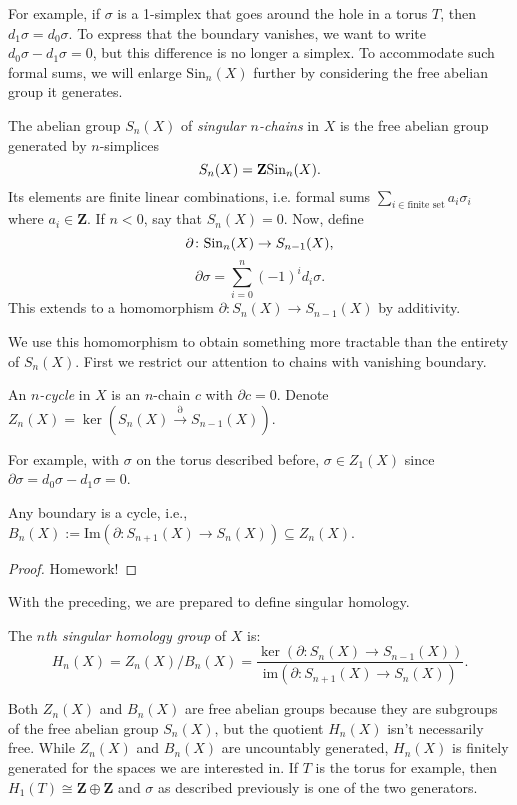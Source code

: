 For example, if $\sigma$ is a 1-simplex that goes around the hole in a torus $T$, then $d_1\sigma = d_0\sigma$. To express that the boundary vanishes, we want to write $d_0\sigma - d_1\sigma=0$, but this difference is no longer a simplex. To accommodate such formal sums, we will enlarge $\mathrm{Sin}_n(X)$ further by considering the free abelian group it generates.
\begin{definition}
The abelian group $S_n(X)$ of \emph{singular $n$-chains} in $X$ is the free abelian group generated by $n$-simplices
$$S_n(X) = \mathbf{Z}\mathrm{Sin}_n(X).$$
    Its elements are finite linear combinations, i.e. formal sums $\sum_{i\in\text{finite set}}a_i\sigma_i$ where $a_i\in\mathbf{Z}$. If $n<0$, say that $S_n(X)=0$. Now, define
$$\partial\colon \mathrm{Sin}_n(X)\to S_{n-1}(X),$$
$$\partial\sigma = \sum_{i=0}^n(-1)^i d_i\sigma.$$
This extends to a homomorphism $\partial \colon S_n(X) \to S_{n-1}(X)$ by additivity.
\end{definition}
We use this homomorphism to obtain something more tractable than the entirety of $S_n(X)$. First we restrict our attention to chains with vanishing boundary.
\begin{definition}
An \emph{$n$-cycle} in $X$ is an $n$-chain $c$ with $\partial c = 0$. Denote $Z_n(X) = \ker(S_n(X)\xrightarrow{\partial}S_{n-1}(X))$.
\end{definition}
For example, with $\sigma$ on the torus described before, $\sigma\in Z_1(X)$ since $\partial \sigma = d_0\sigma - d_1\sigma = 0$.
\begin{theorem}
Any boundary is a cycle, i.e., $B_n(X) := \mathrm{Im}(\partial:S_{n+1}(X)\to S_n(X))\subseteq Z_n(X)$.
\end{theorem}
\begin{proof}
    Homework!
\end{proof}
With the preceding, we are prepared to define singular homology.
\begin{definition}
The \emph{$n$th singular homology group} of $X$ is:
    $$ H_n(X) = Z_n(X)/B_n(X) = \frac{\ker(\partial:S_n(X)\to S_{n-1}(X))}{\mathrm{im}(\partial:S_{n+1}(X)\to S_n(X))}.$$
\end{definition}
Both $Z_n(X)$ and $B_n(X)$ are free abelian groups because they are subgroups of the free abelian group $S_n(X)$, but the quotient $H_n(X)$ isn't necessarily free. While $Z_n(X)$ and $B_n(X)$ are uncountably generated, $H_n(X)$ is finitely generated for the spaces we are interested in. If $T$ is the torus for example, then $H_1(T) \cong \mathbf{Z} \oplus \mathbf{Z}$ and $\sigma$ as described previously is one of the two generators.
